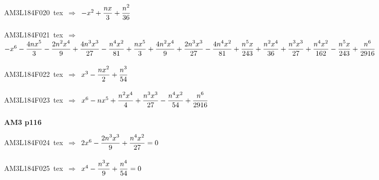 {\sixrm AM3L184F020\ {\sixit tex}\ }$\Rightarrow$\ $- x^{2} + {\displaystyle\strut {nx}\over \displaystyle\strut 3} + {\displaystyle\strut n^{2}\over \displaystyle\strut 36}$\par\smallskip
{\sixrm AM3L184F021\ {\sixit tex}\ }$\Rightarrow$\ $- x^{6} - {\displaystyle\strut {4nx^{5}}\over \displaystyle\strut 3} - {\displaystyle\strut {2n^{2}x^{4}}\over \displaystyle\strut 9} + {\displaystyle\strut {4n^{3}x^{3}}\over \displaystyle\strut 27} - {\displaystyle\strut {n^{4}x^{2}}\over \displaystyle\strut 81} + {\displaystyle\strut {nx^{5}}\over \displaystyle\strut 3} + {\displaystyle\strut {4n^{2}x^{4}}\over \displaystyle\strut 9} + {\displaystyle\strut {2n^{3}x^{3}}\over \displaystyle\strut 27} - {\displaystyle\strut {4n^{4}x^{2}}\over \displaystyle\strut 81} + {\displaystyle\strut {n^{5}x}\over \displaystyle\strut 243} + {\displaystyle\strut {n^{2}x^{4}}\over \displaystyle\strut 36} + {\displaystyle\strut {n^{3}x^{3}}\over \displaystyle\strut 27} + {\displaystyle\strut {n^{4}x^{2}}\over \displaystyle\strut 162} - {\displaystyle\strut {n^{5}x}\over \displaystyle\strut 243} + {\displaystyle\strut n^{6}\over \displaystyle\strut 2916}$\par\smallskip
{\sixrm AM3L184F022\ {\sixit tex}\ }$\Rightarrow$\ $x^{3} - {\displaystyle\strut {nx^{2}}\over \displaystyle\strut 2} + {\displaystyle\strut n^{3}\over \displaystyle\strut 54}$\par\smallskip
{\sixrm AM3L184F023\ {\sixit tex}\ }$\Rightarrow$\ $x^{6} - nx^{5} + {\displaystyle\strut {n^{2}x^{4}}\over \displaystyle\strut 4} + {\displaystyle\strut {n^{3}x^{3}}\over \displaystyle\strut 27} - {\displaystyle\strut {n^{4}x^{2}}\over \displaystyle\strut 54} + {\displaystyle\strut n^{6}\over \displaystyle\strut 2916}$\par\smallskip

\par\vfill\eject
{\bf\hfill AM3 p116\hfill\hbox{}}\par\bigskip
{\sixrm AM3L184F024\ {\sixit tex}\ }$\Rightarrow$\ $2x^{6} - {\displaystyle\strut {2n^{3}x^{3}}\over \displaystyle\strut 9} + {\displaystyle\strut {n^{4}x^{2}}\over \displaystyle\strut 27} = 0$\par\smallskip
{\sixrm AM3L184F025\ {\sixit tex}\ }$\Rightarrow$\ $x^{4} - {\displaystyle\strut {n^{3}x}\over \displaystyle\strut 9} + {\displaystyle\strut n^{4}\over \displaystyle\strut 54} = 0$\par\smallskip

